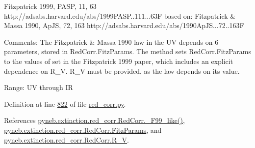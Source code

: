\begin{DoxyVerb}
\begin{DoxyVerb}
Fitzpatrick 1999, PASP, 11, 63
http://adsabs.harvard.edu/abs/1999PASP..111...63F
based on: 
Fitzpatrick & Massa 1990, ApJS, 72, 163
http://adsabs.harvard.edu/abs/1990ApJS...72..163F

Comments:
The Fitzpatrick & Massa 1990 law in the UV depends on 6 parameters, stored in RedCorr.FitzParams.
The method sets RedCorr.FitzParams to the values of set in the Fitzpatrick 1999 paper, 
which includes an explicit dependence on R_V.
R_V must be provided, as the law depends on its value.

Range: UV through IR\end{DoxyVerb}
 

Definition at line \hyperlink{red__corr_8py_source_l00822}{822} of file \hyperlink{red__corr_8py_source}{red\+\_\+corr.\+py}.



References \hyperlink{red__corr_8py_source_l00658}{pyneb.\+extinction.\+red\+\_\+corr.\+Red\+Corr.\+\_\+\+F99\+\_\+like()}, \hyperlink{red__corr_8py_source_l00078}{pyneb.\+extinction.\+red\+\_\+corr.\+Red\+Corr.\+Fitz\+Params}, and \hyperlink{red__corr_8py_source_l00204}{pyneb.\+extinction.\+red\+\_\+corr.\+Red\+Corr.\+R\+\_\+\+V}.



\end{DoxyVerb}
